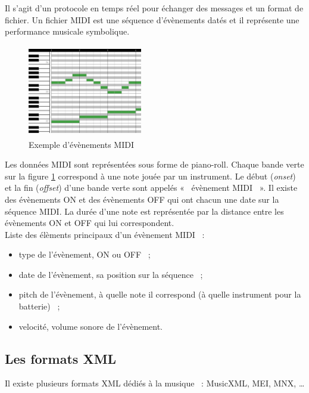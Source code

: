 Il s’agit d’un protocole en temps réel pour échanger des messages et un format
de fichier. Un fichier MIDI est une séquence d’évènements datés et il
représente une performance musicale symbolique.

\begin{figure}[h]
	\centering
	\includegraphics[height=40mm, width=50mm]{
    z_images/1_contexte/2_midi_piano.jpg}
	\caption{Exemple d’évènements MIDI}
	\label{piano_roll}
\end{figure}
Les données MIDI sont représentées sous forme de piano-roll. Chaque bande verte
sur la figure \ref{piano_roll} correspond à une note jouée par un instrument.
Le début (\textit{onset}) et la fin (\textit{offset}) d’une bande verte sont
appelés «~ évènement MIDI~ ». Il existe des évènements ON et des évènements OFF
qui ont chacun une date sur la séquence MIDI. La durée d’une note est
représentée par la distance entre les évènements ON et OFF qui lui
correspondent.\\

Liste des élèments principaux d’un évènement MIDI~ :
\begin{itemize}
    \item type de l’évènement, ON ou OFF~ ;
    \item date de l’évènement, sa position sur la séquence~ ;
    \item pitch de l’évènement, à quelle note il correspond (à quelle
        instrument pour la batterie)~ ;
    \item velocité, volume sonore de l’évènement.\\
\end{itemize}


\subsection*{Les formats XML}
Il existe plusieurs formats XML dédiés à la musique~ : MusicXML, MEI, MNX, …

